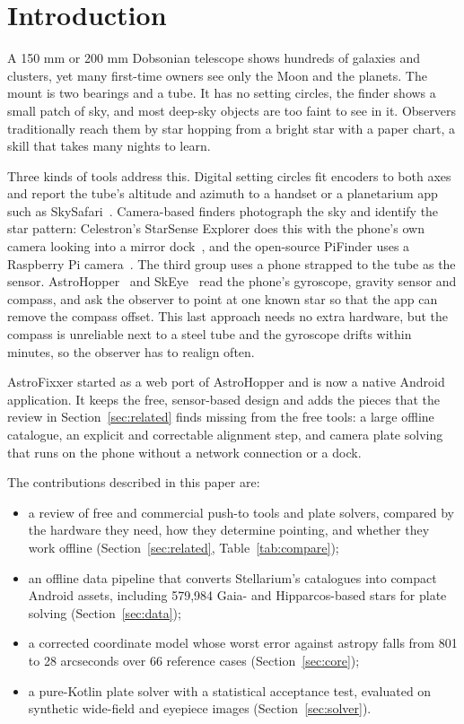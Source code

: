 \section{Introduction}

A 150 mm or 200 mm Dobsonian telescope shows hundreds of galaxies and clusters, yet many first-time owners see only the Moon and the planets. The mount is two bearings and a tube. It has no setting circles, the finder shows a small patch of sky, and most deep-sky objects are too faint to see in it. Observers traditionally reach them by star hopping from a bright star with a paper chart, a skill that takes many nights to learn.

Three kinds of tools address this. Digital setting circles fit encoders to both axes and report the tube's altitude and azimuth to a handset or a planetarium app such as SkySafari~\cite{skysafari}. Camera-based finders photograph the sky and identify the star pattern: Celestron's StarSense Explorer does this with the phone's own camera looking into a mirror dock~\cite{starsense}, and the open-source PiFinder uses a Raspberry Pi camera~\cite{pifinder}. The third group uses a phone strapped to the tube as the sensor. AstroHopper~\cite{astrohopper} and SkEye~\cite{skeye} read the phone's gyroscope, gravity sensor and compass, and ask the observer to point at one known star so that the app can remove the compass offset. This last approach needs no extra hardware, but the compass is unreliable next to a steel tube and the gyroscope drifts within minutes, so the observer has to realign often.

AstroFixxer started as a web port of AstroHopper and is now a native Android application. It keeps the free, sensor-based design and adds the pieces that the review in Section~\ref{sec:related} finds missing from the free tools: a large offline catalogue, an explicit and correctable alignment step, and camera plate solving that runs on the phone without a network connection or a dock.

The contributions described in this paper are:
\begin{itemize}
\item a review of free and commercial push-to tools and plate solvers, compared by the hardware they need, how they determine pointing, and whether they work offline (Section~\ref{sec:related}, Table~\ref{tab:compare});
\item an offline data pipeline that converts Stellarium's catalogues into compact Android assets, including 579,984 Gaia- and Hipparcos-based stars for plate solving (Section~\ref{sec:data});
\item a corrected coordinate model whose worst error against astropy falls from 801 to 28 arcseconds over 66 reference cases (Section~\ref{sec:core});
\item a pure-Kotlin plate solver with a statistical acceptance test, evaluated on synthetic wide-field and eyepiece images (Section~\ref{sec:solver}).
\end{itemize}


